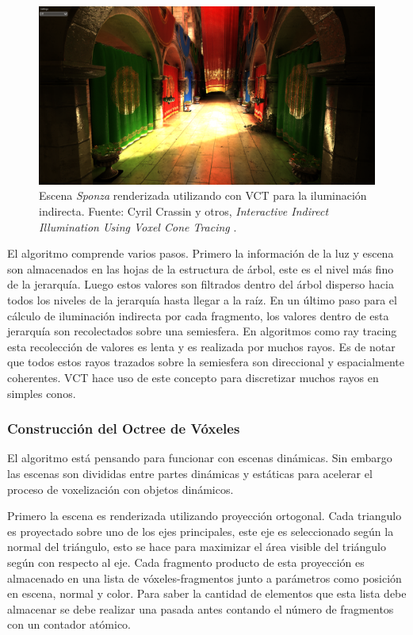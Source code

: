 \begin{figure}[H]
	\centering
	\includegraphics[width=0.9\linewidth]{media/givoxels_sponzanew1.png}
	\caption{Escena \emph{Sponza} renderizada utilizando con \acl{VCT} para la iluminación indirecta. Fuente: Cyril Crassin y otros, \emph{Interactive Indirect Illumination Using Voxel Cone Tracing} \cite{CNSGE11b}.}
	\label{fig:givoxels_sponzanew1}
\end{figure}

El algoritmo comprende varios pasos. Primero la información de la luz y escena son almacenados en las hojas de la estructura de árbol, este es el nivel más fino de la jerarquía. Luego estos valores son filtrados dentro del árbol disperso hacia todos los niveles de la jerarquía hasta llegar a la raíz. En un último paso para el cálculo de iluminación indirecta por cada fragmento, los valores dentro de esta jerarquía son recolectados sobre una semiesfera. En algoritmos como ray tracing esta recolección de valores es lenta y es realizada por muchos rayos. Es de notar que todos estos rayos trazados sobre la semiesfera son direccional y espacialmente coherentes. \ac{VCT} hace uso de este concepto para discretizar muchos rayos en simples conos.

\subsubsection{Construcción del Octree de Vóxeles}
El algoritmo está pensando para funcionar con escenas dinámicas. Sin embargo las escenas son divididas entre partes dinámicas y estáticas para acelerar el proceso de voxelización con objetos dinámicos.

Primero la escena es renderizada utilizando proyección ortogonal. Cada triangulo es proyectado sobre uno de los ejes principales, este eje es seleccionado según la normal del triángulo, esto se hace para maximizar el área visible del triángulo según con respecto al eje. Cada fragmento producto de esta proyección es almacenado en una lista de vóxeles-fragmentos junto a parámetros como posición en escena, normal y color. Para saber la cantidad de elementos que esta lista debe almacenar se debe realizar una pasada antes contando el número de fragmentos con un contador atómico.

